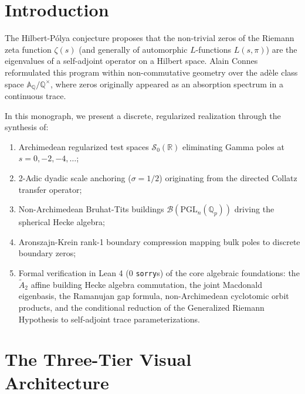 \documentclass[11pt,reqno,a4paper]{article}
\theoremstyle{definition}
\begin{document}
\section{Introduction}

The Hilbert-P\'olya conjecture proposes that the non-trivial zeros of the Riemann zeta function $\zeta(s)$ (and generally of automorphic $L$-functions $L(s, \pi)$) are the eigenvalues of a self-adjoint operator on a Hilbert space. Alain Connes reformulated this program within non-commutative geometry over the ad\`ele class space $\mathbb{A}_\mathbb{Q} / \mathbb{Q}^\times$, where zeros originally appeared as an absorption spectrum in a continuous trace.

In this monograph, we present a discrete, regularized realization through the synthesis of:
\begin{enumerate}
    \item Archimedean regularized test spaces $\mathcal{S}_0(\mathbb{R})$ eliminating Gamma poles at $s=0, -2, -4, \dots$;
    \item 2-Adic dyadic scale anchoring ($\sigma = 1/2$) originating from the directed Collatz transfer operator;
    \item Non-Archimedean Bruhat-Tits buildings $\mathcal{B}(\mathrm{PGL}_n(\mathbb{Q}_p))$ driving the spherical Hecke algebra;
    \item Aronszajn-Krein rank-1 boundary compression mapping bulk poles to discrete boundary zeros;
    \item Formal verification in Lean 4 (0 \texttt{sorry}s) of the core algebraic foundations: the $\tilde{A}_2$ affine building Hecke algebra commutation, the joint Macdonald eigenbasis, the Ramanujan gap formula, non-Archimedean cyclotomic orbit products, and the conditional reduction of the Generalized Riemann Hypothesis to self-adjoint trace parameterizations.
\end{enumerate}

\section{The Three-Tier Visual Architecture}
\end{document}
